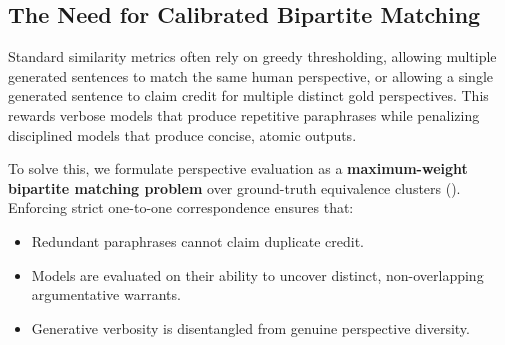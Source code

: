 \documentclass[11pt,a4paper]{article}
\begin{document}
\subsection{The Need for Calibrated Bipartite Matching}
\label{subsec:need_for_matching}

Standard similarity metrics often rely on greedy thresholding, allowing multiple generated sentences to match the same human perspective, or allowing a single generated sentence to claim credit for multiple distinct gold perspectives. This rewards verbose models that produce repetitive paraphrases while penalizing disciplined models that produce concise, atomic outputs.

To solve this, we formulate perspective evaluation as a \textbf{maximum-weight bipartite matching problem} over ground-truth equivalence clusters (). Enforcing strict one-to-one correspondence ensures that:
\begin{itemize}[leftmargin=*,itemsep=1pt]
    \item Redundant paraphrases cannot claim duplicate credit.
    \item Models are evaluated on their ability to uncover distinct, non-overlapping argumentative warrants.
    \item Generative verbosity is disentangled from genuine perspective diversity.
\end{itemize}
\end{document}
